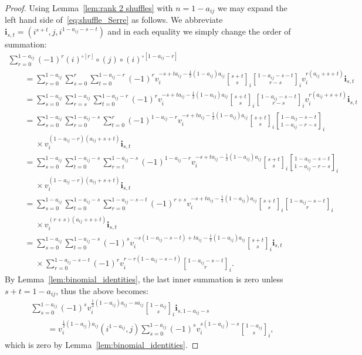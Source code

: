 \documentclass[pdftex]{sigma}
\numberwithin{equation}{section}
\begin{document}
\begin{proof}
Using Lemma~\ref{lem:rank 2 shuffles} with $n=1-a_{ij}$ we may expand the left hand side of~\eqref{eq:shuffle_Serre} as follows.
We abbreviate $\mathbf{i}_{s,t}=(i^{s+t},j,i^{1-a_{ij}-s-t})$ and in each equality we simply change the order of summation:
\begin{gather*}
 \sum\limits_{r=0}^{1-a_{ij}} (-1)^r (i)^{\circ[r]}\circ(j)\circ(i)^{\circ[1-a_{ij}-r]}
\\
\qquad = \sum\limits_{r=0}^{1-a_{ij}}\sum\limits_{s=0}^r\sum\limits_{t=0}^{1-a_{ij}-r} (-1)^r v_i^{-s+ta_{ij}-\frac{1}{2}
(1-a_{ij})a_{ij}} {s+t\brack s}_i {1-a_{ij}-s-t\brack r-s}_i v_i^{r(a_{ij}+s+t)}\mathbf{i}_{s,t}
\\
\qquad = \sum\limits_{s=0}^{1-a_{ij}}\sum\limits_{r=s}^{1-a_{ij}}\sum\limits_{t=0}^{1-a_{ij}-r} (-1)^r
v_i^{-s+ta_{ij}-\frac{1}{2} (1-a_{ij})a_{ij}} {s+t\brack s}_i {1-a_{ij}-s-t\brack r-s}_i
v_i^{r(a_{ij}+s+t)}\mathbf{i}_{s,t}
\\
 \qquad = \sum\limits_{s=0}^{1-a_{ij}}\sum\limits_{r=0}^{1-a_{ij}-s}\sum\limits_{t=0}^r (-1)^{1-a_{ij}-r}
v_i^{-s+ta_{ij}-\frac{1}{2} (1-a_{ij})a_{ij}} {s+t\brack s}_i {1-a_{ij}-s-t\brack 1-a_{ij}-r-s}_i
\\
\qquad\phantom{=}\times v_i^{(1-a_{ij}-r)(a_{ij}+s+t)}\mathbf{i}_{s,t}
\\
\qquad = \sum\limits_{s=0}^{1-a_{ij}}\sum\limits_{t=0}^{1-a_{ij}-s}\sum\limits_{r=t}^{1-a_{ij}-s} (-1)^{1-a_{ij}-r}
v_i^{-s+ta_{ij}-\frac{1}{2} (1-a_{ij})a_{ij}} {s+t\brack s}_i {1-a_{ij}-s-t\brack 1-a_{ij}-r-s}_i
\\
\qquad\phantom{=}\times
v_i^{(1-a_{ij}-r)(a_{ij}+s+t)}\mathbf{i}_{s,t}
\\
\qquad = \sum\limits_{s=0}^{1-a_{ij}}\sum\limits_{t=0}^{1-a_{ij}-s}\sum\limits_{r=0}^{1-a_{ij}-s-t} (-1)^{r+s}
v_i^{-s+ta_{ij}-\frac{1}{2} (1-a_{ij})a_{ij}} {s+t\brack s}_i {1-a_{ij}-s-t\brack r}_i\\
\qquad\phantom{=}\times
v_i^{(r+s)(a_{ij}+s+t)}\mathbf{i}_{s,t}
\\
 \qquad = \sum\limits_{s=0}^{1-a_{ij}}\sum\limits_{t=0}^{1-a_{ij}-s} (-1)^s v_i^{-s(1-a_{ij}-s-t)+ta_{ij}-\frac{1}{2}
(1-a_{ij})a_{ij}} {s+t\brack s}_i \mathbf{i}_{s,t}
\\
\qquad\phantom{=}
\times
\sum\limits_{r=0}^{1-a_{ij}-s-t} (-1)^r v_i^{r-r(1-a_{ij}-s-t)}{1-a_{ij}-s-t\brack r}_i.
\end{gather*}
By Lemma~\ref{lem:binomial_identities}, the last inner summation is zero unless $s+t=1-a_{ij}$, thus the above becomes:
\begin{gather*}
\sum\limits_{s=0}^{1-a_{ij}} (-1)^s v_i^{\frac{1}{2}(1-a_{ij})a_{ij}-sa_{ij}} {1-a_{ij} \brack s}_i \mathbf{i}_{s,1-a_{ij}-s}
\\
\qquad
=v_i^{\frac{1}{2} (1-a_{ij})a_{ij}} (i^{1-a_{ij}},j)\sum\limits_{s=0}^{1-a_{ij}}(-1)^s
v_i^{s(1-a_{ij})-s}{1-a_{ij}\brack s}_i,
\end{gather*}
which is zero by Lemma~\ref{lem:binomial_identities}.
\end{proof}
\end{document}
